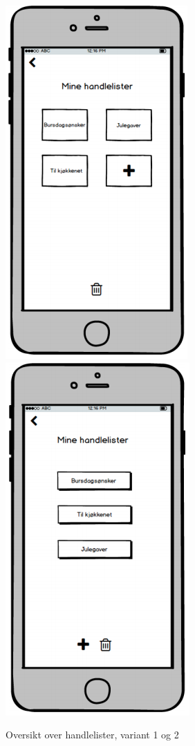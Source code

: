 \begin{figure}[H]
\includegraphics[scale=0.47]{images/prototype1/oversikthandlelister}
\centering %
\includegraphics[scale=0.47]{images/prototype1/oversikthandlelister2}
\centering %
\caption{Oversikt over handlelister, variant 1 og 2}
\label{fig:oversikthandlelister}
\end{figure}

